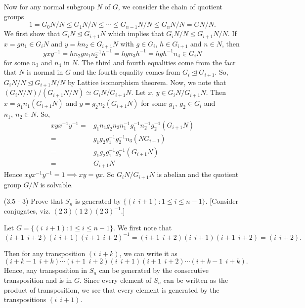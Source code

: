 \documentclass[12pt]{article}
\begin{document}
\begin{enumerate}
\begin{mybox}
    \vspace*{3mm}
    Now for any normal subgroup $N$ of $G$, we
    consider the chain of quotient groups
    $$1=G_0N/N\leq G_1N/N
    \leq \cdots 
    \leq G_{n-1}N/N
    \leq G_nN/N=GN/N.$$
    We first show that $G_iN\trianglelefteq
    G_{i+1}N$ which implies that 
    $G_iN/N\trianglelefteq
    G_{i+1}N/N.$ If $x=gn_1\in G_{i}N$
    and $y=hn_2\in G_{i+1}N$ with 
    $g\in G_i$, $h\in
    G_{i+1}$ and $n\in N$, then
    $$yxy^{-1}=hn_2gn_1n_2^{-1}h^{-1}=hgn_3h^{-1}
    =hgh^{-1}n_4\in G_iN$$
    for some $n_3$ and $n_4$ in $N$. The third and
    fourth equalities come from the facr that $N$ is
    normal in $G$ and the fourth equality comes from
    $G_{i}\trianglelefteq G_{i+1}$. So,
    $G_iN/N\trianglelefteq
    G_{i+1}N/N$ by Lattice isomorphism theorem.
    Now, we note that
    $(G_iN/N)/(G_{i+1}N/N)\simeq
    G_iN/G_{i+1}N.$
    Let $x$, $y\in G_iN/G_{i+1}N$. Then
    $x=g_1n_1(G_{i+1}N)$ and $y=g_2n_2(G_{i+1}N)$
    for some $g_1,\ g_2\in G_i$ and 
    $n_1,\ n_2\in N$. So,
    \begin{align*}
        xyx^{-1}y^{-1}=&g_1n_1g_2n_2n_1^{-1}
        g_1^{-1}n_2^{-1}g_2^{-1}(G_{i+1}N)\\
        =&g_1g_2
        g_1^{-1}g_2^{-1}n_3(NG_{i+1})\\
        =&g_1g_2
        g_1^{-1}g_2^{-1}(G_{i+1}N)\\
        =&G_{i+1}N
    \end{align*}
    Hence $xyx^{-1}y^{-1}=1\implies xy=yx$.
    So $G_iN/G_{i+1}N$ is abelian and the quotient
    group $G/N$ is solvable.
\end{mybox}


\item[(3.5 - 3)] Prove that $S_n$ is generated by
    $\{(i\ \ i+1): 1\leq i\leq n-1\}$. [Consider conjugates,
    viz. $(2\ 3)(1\ 2)(2\ 3)^{-1}$.]

\begin{mybox}
    
    Let $G=\{(i\ \ i+1): 1\leq i\leq n-1\}.$
    We first note that
    $$(i+1\ \ i+2)(i\ \ i+1)(i+1\ \ i+2)^{-1}=
    (i+1\ \ i+2)(i\ \ i+1)(i+1\ \ i+2)=
    (i\ \ i+2).$$

    Then for any transposition $(i\ \ i+k)$, we can
    write it as
    $$(i+k-1\ \ i+k)\cdots(i+1\ \ i+2)(i\ \ i+1)
    (i+1\ \ i+2)\cdots(i+k-1\ \ i+k).$$
    Hence, any transposition in $S_n$
    can be generated by
    the consecutive transposition and is in $G$.
    Since every element of $S_n$ can be written as
    the product of transposition, we see that
    every element is generated by the transpositions
    $(i\ \ i+1)$.
\end{mybox}


\end{enumerate}
\end{document}
